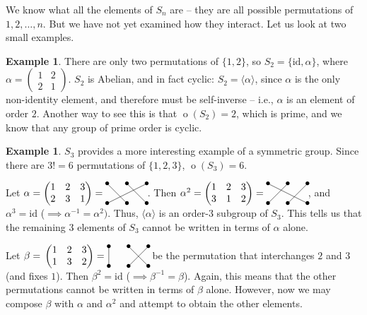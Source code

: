 \documentclass[svgnames]{article}
\theoremstyle{definition}
\newtheorem{Example}[Theorem]{Example}
\theoremstyle{remark}
\DeclareMathOperator{\ord}{o}
\newcommand{\id}{\mathrm{id}}
\begin{document}
\begin{appendices}
We know what all the elements of $S_n$ are -- they are all possible permutations of $1, 2, \ldots, n$. But we have not yet examined how they interact. Let us look at two small examples.

\begin{Example}\label{ex:S2}
There are only two permutations of $\{1, 2\}$, so $S_2 = \{\id, \alpha\}$, where $\alpha = \begin{pmatrix}1 & 2\\ 2 & 1\end{pmatrix}$. $S_2$ is Abelian, and in fact cyclic: $S_2 = \langle \alpha \rangle$, since $\alpha$ is the only non-identity element, and therefore must be self-inverse -- i.e., $\alpha$ is an element of order $2$. Another way to see this is that $\ord(S_2) = 2$, which is prime, and we know that any group of prime order is cyclic.
\end{Example}

\begin{Example}\label{ex:S3}
$S_3$ provides a more interesting example of a symmetric group. Since there are $3! = 6$ permutations of $\{1, 2, 3\}$, $\ord(S_3) = 6$.

Let $\alpha = \begin{pmatrix}
1 & 2 & 3\\
2 & 3 & 1
\end{pmatrix} = \,\vcenter{\xymatrix@=2em{
	*=0{\bullet} \ar@{-}[dr]	&	*=0{\bullet} \ar@{-}[dr]	&	*=0{\bullet} \ar@{-}[dll]\\
	*=0{\bullet}	&	*=0{\bullet}	&	*=0{\bullet}
}}$. Then $\alpha^2 = \begin{pmatrix}
1 & 2 & 3\\
3 & 1 & 2
\end{pmatrix} = \,\vcenter{\xymatrix@=2em{
	*=0{\bullet} \ar@{-}[drr]	&	*=0{\bullet} \ar@{-}[dl]	&	*=0{\bullet} \ar@{-}[dl]\\
	*=0{\bullet}	&	*=0{\bullet}	&	*=0{\bullet}
}}$, and $\alpha^3 = \id$ ($\implies \alpha^{-1} = \alpha^2)$. Thus, $\langle \alpha \rangle$ is an order-$3$ subgroup of $S_3$. This tells us that the remaining $3$ elements of $S_3$ cannot be written in terms of $\alpha$ alone.

Let $\beta = \,\begin{pmatrix}
1 & 2 & 3\\
1 & 3 & 2
\end{pmatrix} = \,\vcenter{\xymatrix@=2em{
	*=0{\bullet} \ar@{-}[d]		&	*=0{\bullet} \ar@{-}[dr]	&	*=0{\bullet} \ar@{-}[dl]\\
	*=0{\bullet}	&	*=0{\bullet}	&	*=0{\bullet}
}}$ be the permutation that interchanges $2$ and $3$ (and fixes $1$). Then $\beta^2 = \id$ ($\implies \beta^{-1} = \beta$). Again, this means that the other permutations cannot be written in terms of $\beta$ alone. However, now we may compose $\beta$ with $\alpha$ and $\alpha^2$ and attempt to obtain the other elements.


\end{Example}
\end{appendices}
\end{document}
